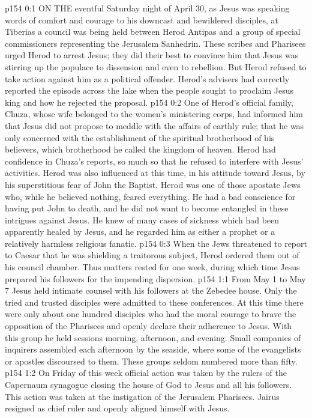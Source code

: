 \vs p154 0:1 ON THE eventful Saturday night of April 30, as Jesus was speaking words of comfort and courage to his downcast and bewildered disciples, at Tiberias a council was being held between Herod Antipas and a group of special commissioners representing the Jerusalem Sanhedrin. These scribes and Pharisees urged Herod to arrest Jesus; they did their best to convince him that Jesus was stirring up the populace to dissension and even to rebellion. But Herod refused to take action against him as a political offender. Herod’s advisers had correctly reported the episode across the lake when the people sought to proclaim Jesus king and how he rejected the proposal.
\vs p154 0:2 One of Herod’s official family, Chuza, whose wife belonged to the women’s ministering corps, had informed him that Jesus did not propose to meddle with the affairs of earthly rule; that he was only concerned with the establishment of the spiritual brotherhood of his believers, which brotherhood he called the kingdom of heaven. Herod had confidence in Chuza’s reports, so much so that he refused to interfere with Jesus’ activities. Herod was also influenced at this time, in his attitude toward Jesus, by his superstitious fear of John the Baptist. Herod was one of those apostate Jews who, while he believed nothing, feared everything. He had a bad conscience for having put John to death, and he did not want to become entangled in these intrigues against Jesus. He knew of many cases of sickness which had been apparently healed by Jesus, and he regarded him as either a prophet or a relatively harmless religious fanatic.
\vs p154 0:3 When the Jews threatened to report to Caesar that he was shielding a traitorous subject, Herod ordered them out of his council chamber. Thus matters rested for one week, during which time Jesus prepared his followers for the impending dispersion.
\vs p154 1:1 From May 1 to May 7 Jesus held intimate counsel with his followers at the Zebedee house. Only the tried and trusted disciples were admitted to these conferences. At this time there were only about one hundred disciples who had the moral courage to brave the opposition of the Pharisees and openly declare their adherence to Jesus. With this group he held sessions morning, afternoon, and evening. Small companies of inquirers assembled each afternoon by the seaside, where some of the evangelists or apostles discoursed to them. These groups seldom numbered more than fifty.
\vs p154 1:2 On Friday of this week official action was taken by the rulers of the Capernaum synagogue closing the house of God to Jesus and all his followers. This action was taken at the instigation of the Jerusalem Pharisees. Jairus resigned as chief ruler and openly aligned himself with Jesus.
